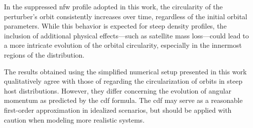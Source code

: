 \documentclass[twocolumn, a4paper]{article}
\begin{document}
In the suppressed \acrlong{nfw} profile adopted in this work, the circularity of the perturber's orbit consistently increases over time, regardless of the initial orbital parameters. While this behavior is expected for steep density profiles, the inclusion of additional physical effects—such as satellite mass loss—could lead to a more intricate evolution of the orbital circularity, especially in the innermost regions of the distribution.

The results obtained using the simplified numerical setup presented in this work qualitatively agree with those of \citeauthor{Vasiliev2022} regarding the circularization of orbits in steep host distributions. However, they differ concerning the evolution of angular momentum as predicted by the \acrshort{cdf} formula. The \acrshort{cdf} may serve as a reasonable first-order approximation in idealized scenarios, but should be applied with caution when modeling more realistic systems.



\end{document}
